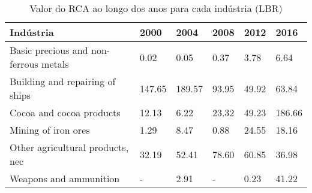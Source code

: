 \begin{table}
\centering
\caption{Valor do RCA ao longo dos anos para cada indústria (LBR)}
\begin{tabular}{p{6cm}p{1.5cm}p{1.5cm}p{1.5cm}p{1.5cm}p{1.5cm}}
\toprule
                            Indústria &   2000 &   2004 &  2008 &  2012 &   2016 \\
\midrule
Basic precious and non-ferrous metals &   0.02 &   0.05 &  0.37 &  3.78 &   6.64 \\
      Building and repairing of ships & 147.65 & 189.57 & 93.95 & 49.92 &  63.84 \\
             Cocoa and cocoa products &  12.13 &   6.22 & 23.32 & 49.23 & 186.66 \\
                  Mining of iron ores &   1.29 &   8.47 &  0.88 & 24.55 &  18.16 \\
     Other agricultural products, nec &  32.19 &  52.41 & 78.60 & 60.85 &  36.98 \\
               Weapons and ammunition &      - &   2.91 &     - &  0.23 &  41.22 \\
\bottomrule
\end{tabular}
\end{table}
